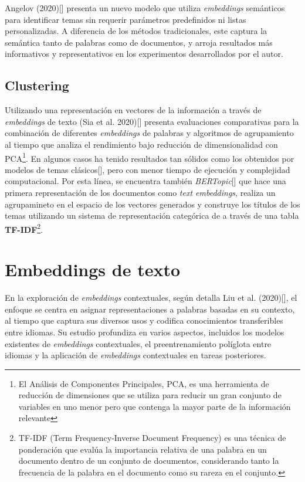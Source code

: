     Angelov (2020)[\cite{angelov2020top2vec}] presenta un nuevo modelo que utiliza \emph{embeddings} semánticos para identificar temas sin requerir parámetros predefinidos ni listas personalizadas. A diferencia de los métodos tradicionales, este captura la semántica tanto de palabras como de documentos, y arroja resultados más informativos y representativos en los experimentos desarrollados por el autor.

    \subsection{Clustering}
    Utilizando una representación en vectores de la información a través de \emph{embeddings} de texto (Sia et al. 2020)[\cite{sia2020tired}] presenta evaluaciones comparativas para la combinación de diferentes \emph{embeddings} de palabras y algoritmos de agrupamiento al tiempo que analiza el rendimiento bajo reducción de dimensionalidad con PCA\footnote{El Análisis de Componentes Principales, PCA, es una herramienta de reducción de dimensiones que se utiliza para reducir un gran conjunto de variables en uno menor pero que contenga la mayor parte de la información relevante}. En algunos casos ha tenido resultados tan sólidos como los obtenidos por modelos de temas clásicos[\cite{sia2020tiredResults}], pero con menor tiempo de ejecución y complejidad computacional. 
    Por esta línea, se encuentra también \emph{BERTopic}[\cite{bertopic}] que hace una primera representación de los documentos como \emph{text embeddings}, realiza un agrupamineto en el espacio de los vectores generados y construye los títulos de los temas utilizando un sistema de representación categórica de a través de una tabla \textbf{TF-IDF}\footnote{TF-IDF (Term Frequency-Inverse Document Frequency) es una técnica de ponderación que evalúa la importancia relativa de una palabra en un documento dentro de un conjunto de documentos, considerando tanto la frecuencia de la palabra en el documento como su rareza en el conjunto.}.

\section{Embeddings de texto}
    En la exploración de \emph{embeddings} contextuales, según detalla Liu et al. (2020)[\cite{liu2020survey}], el enfoque se centra en asignar representaciones a palabras basadas en su contexto, al tiempo que captura sus diversos usos y codifica conocimientos transferibles entre idiomas. Su estudio profundiza en varios aspectos, incluidos los modelos existentes de \emph{embeddings} contextuales, el preentrenamiento políglota entre idiomas y la aplicación de \emph{embeddings} contextuales en tareas posteriores.

